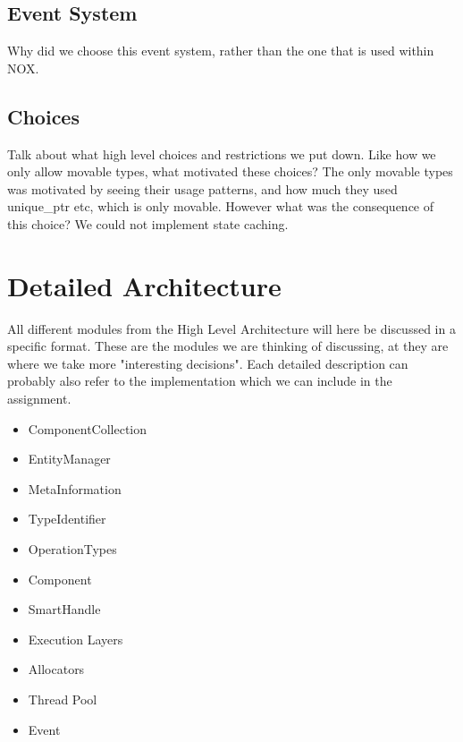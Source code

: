 \subsection{Event System}
Why did we choose this event system, rather than the one that is used within NOX.

\subsection{Choices}
Talk about what high level choices and restrictions we put down.
Like how we only allow movable types, what motivated these choices?
The only movable types was motivated by seeing their usage patterns, and how much they used unique\_ptr etc, which is only movable.
However what was the consequence of this choice? We could not implement state caching.

\section{Detailed Architecture}
All different modules from the High Level Architecture will here be discussed in a specific format.
These are the modules we are thinking of discussing, at they are where we take more "interesting decisions".
Each detailed description can probably also refer to the implementation which we can include in the assignment.

\begin{itemize}
    \item
    ComponentCollection

    \item
    EntityManager

    \item
    MetaInformation

    \item
    TypeIdentifier

    \item
    OperationTypes

    \item
    Component

    \item
    SmartHandle

    \item
    Execution Layers

    \item
    Allocators

    \item
    Thread Pool

    \item
    Event
\end{itemize}

